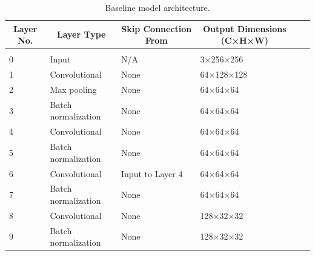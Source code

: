 \documentclass{article} %
\begin{document}
\begin{table}[t]
    \caption{Baseline model architecture.}
    \label{baseline_arch}
    \begin{center}
        \begin{tabular}{llllll}
            \multicolumn{1}{c}{\bf Layer No.} & \multicolumn{1}{c}{\bf Layer Type} & \multicolumn{1}{c}{\bf Skip Connection From} & \multicolumn{1}{c}{\bf Output Dimensions (C×H×W)}
            \\ \hline \\
            0                                 & Input                              & N/A                                          & 3×256×256                                         \\
            1                                 & Convolutional                      & None                                         & 64×128×128                                        \\
            2                                 & Max pooling                        & None                                         & 64×64×64                                          \\
            3                                 & Batch normalization                & None                                         & 64×64×64                                          \\
            4                                 & Convolutional                      & None                                         & 64×64×64                                          \\
            5                                 & Batch normalization                & None                                         & 64×64×64                                          \\
            6                                 & Convolutional                      & Input to Layer 4                             & 64×64×64                                          \\
            7                                 & Batch normalization                & None                                         & 64×64×64                                          \\
            8                                 & Convolutional                      & None                                         & 128×32×32                                         \\
            9                                 & Batch normalization                & None                                         & 128×32×32                                         \\

\end{tabular}
\end{center}
\end{table}
\end{document}
